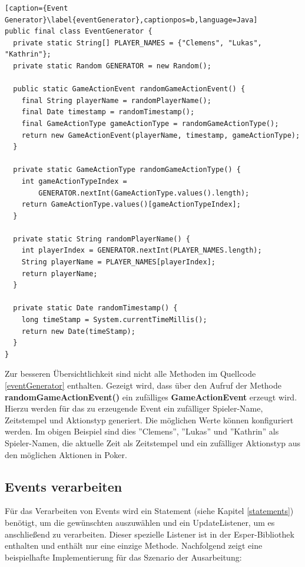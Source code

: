 \begin{lstlisting}[caption={Event Generator}\label{eventGenerator},captionpos=b,language=Java]
public final class EventGenerator {
  private static String[] PLAYER_NAMES = {"Clemens", "Lukas", "Kathrin"};
  private static Random GENERATOR = new Random();
  
  public static GameActionEvent randomGameActionEvent() {
    final String playerName = randomPlayerName();
    final Date timestamp = randomTimestamp();
    final GameActionType gameActionType = randomGameActionType();
    return new GameActionEvent(playerName, timestamp, gameActionType);
  }

  private static GameActionType randomGameActionType() {
    int gameActionTypeIndex = 
    	GENERATOR.nextInt(GameActionType.values().length);
    return GameActionType.values()[gameActionTypeIndex];
  }

  private static String randomPlayerName() {
    int playerIndex = GENERATOR.nextInt(PLAYER_NAMES.length);
    String playerName = PLAYER_NAMES[playerIndex];
    return playerName;
  }

  private static Date randomTimestamp() {
    long timeStamp = System.currentTimeMillis();
    return new Date(timeStamp);
  }
}

\end{lstlisting}
Zur besseren Übersichtlichkeit sind nicht alle Methoden im Quellcode \ref{eventGenerator} enthalten.
Gezeigt wird, dass über den Aufruf der Methode \textbf{randomGameActionEvent()} ein zufälliges \textbf{GameActionEvent} erzeugt wird. Hierzu werden für das zu erzeugende Event ein zufälliger Spieler-Name, Zeitstempel und Aktionstyp generiert. Die möglichen Werte können konfiguriert werden. Im obigen Beispiel sind dies ''Clemens'', ''Lukas'' und ''Kathrin'' als Spieler-Namen, die aktuelle Zeit als Zeitstempel und ein zufälliger Aktionstyp aus den möglichen Aktionen in Poker.

\subsection{Events verarbeiten}
\label{EventsVerarbeiten}
Für das Verarbeiten von Events wird ein Statement (siehe Kapitel \ref{statements}) benötigt, um die gewünschten auszuwählen und ein UpdateListener, um es anschließend zu verarbeiten. Dieser spezielle Listener ist in der Esper-Bibliothek enthalten und enthält nur eine einzige Methode. Nachfolgend zeigt eine beispielhafte Implementierung für das Szenario der Ausarbeitung:

